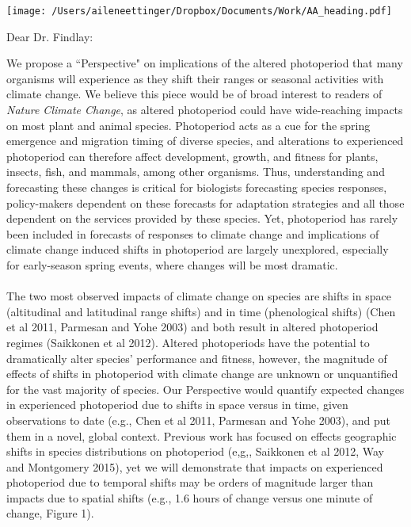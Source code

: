 \documentclass[11pt,a4paper]{letter}
\begin{document}

\begin{letter}{}
\texttt{[image: /Users/aileneettinger/Dropbox/Documents/Work/AA\_heading.pdf]}

\opening{Dear Dr. Findlay:}
We propose a ``Perspective" on implications of the altered photoperiod that many organisms will experience as they shift their ranges or seasonal activities with climate change. 
We believe this piece would be of broad interest to readers of \emph{Nature Climate Change}, as altered photoperiod could have wide-reaching impacts on most plant and animal species. Photoperiod acts as a cue for the spring emergence and migration timing of diverse species, and alterations to experienced photoperiod can therefore affect development, growth, and fitness for plants, insects, fish, and mammals, among other organisms. Thus, understanding and forecasting these changes is critical for biologists forecasting species responses, policy-makers dependent on these forecasts for adaptation strategies and all those dependent on the services provided by these species. Yet, photoperiod has rarely been included in forecasts of responses to climate change and implications of climate change induced shifts in photoperiod are largely unexplored, especially for early-season spring events, where changes will be most dramatic. 
\\
\\
The two most observed impacts of climate change on species are shifts in space (altitudinal and latitudinal range shifts) and in time (phenological shifts) (Chen et al 2011, Parmesan and Yohe 2003) and both result in altered photoperiod regimes (Saikkonen et al 2012).  Altered photoperiods have the potential to dramatically alter species' performance and fitness, however, the magnitude of effects of shifts in photoperiod with climate change are unknown or unquantified for the vast majority of species.  Our Perspective would quantify expected changes in experienced photoperiod due to shifts in space versus in time, given observations to date (e.g., Chen et al 2011, Parmesan and Yohe 2003), and put them in a novel, global context. Previous work has focused on effects geographic shifts in species distributions on photoperiod (e,g,, Saikkonen et al 2012, Way and Montgomery 2015), yet we will demonstrate that impacts on experienced photoperiod due to temporal shifts may be orders of magnitude larger than impacts due to spatial shifts (e.g., 1.6 hours of change versus one minute of change, Figure 1). 
\\

\end{letter}
\end{document}

